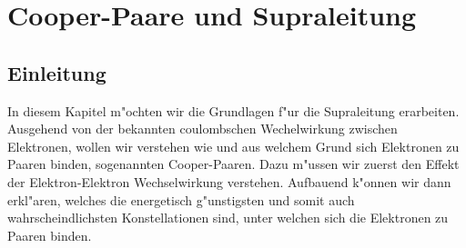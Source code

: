 \chapter{Cooper-Paare und Supraleitung\label{chapter:supraleitung}}
\begin{refsection}


\section{Einleitung}
In diesem Kapitel m"ochten wir die Grundlagen f"ur die Supraleitung erarbeiten.
Ausgehend von der bekannten coulombschen Wechelwirkung zwischen Elektronen, wollen wir verstehen wie und aus welchem Grund sich Elektronen zu Paaren binden, sogenannten Cooper-Paaren.
Dazu m"ussen wir zuerst den Effekt der Elektron-Elektron Wechselwirkung verstehen.
Aufbauend k"onnen wir dann erkl"aren, welches die energetisch g"unstigsten und somit auch wahrscheindlichsten Konstellationen sind, unter welchen sich die Elektronen zu Paaren binden.


\end{refsection}
